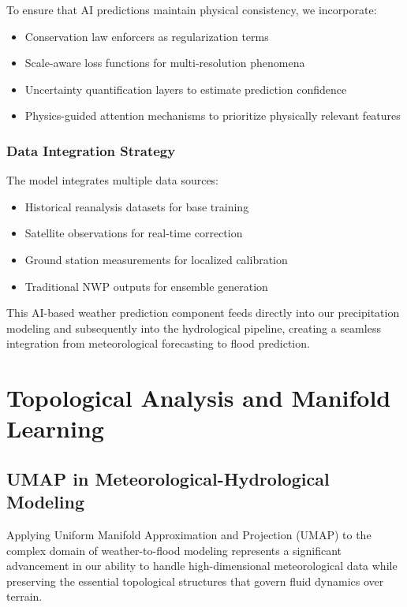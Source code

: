 \documentclass{article}
\begin{document}
To ensure that AI predictions maintain physical consistency, we incorporate:

\begin{itemize}
    \item Conservation law enforcers as regularization terms
    \item Scale-aware loss functions for multi-resolution phenomena
    \item Uncertainty quantification layers to estimate prediction confidence
    \item Physics-guided attention mechanisms to prioritize physically relevant features
\end{itemize}

\subsubsection{Data Integration Strategy}

The model integrates multiple data sources:

\begin{itemize}
    \item Historical reanalysis datasets for base training
    \item Satellite observations for real-time correction
    \item Ground station measurements for localized calibration
    \item Traditional NWP outputs for ensemble generation
\end{itemize}

This AI-based weather prediction component feeds directly into our precipitation modeling and subsequently into the hydrological pipeline, creating a seamless integration from meteorological forecasting to flood prediction.

\section{Topological Analysis and Manifold Learning}

\subsection{UMAP in Meteorological-Hydrological Modeling}

Applying Uniform Manifold Approximation and Projection (UMAP) to the complex domain of weather-to-flood modeling represents a significant advancement in our ability to handle high-dimensional meteorological data while preserving the essential topological structures that govern fluid dynamics over terrain.
\end{document}
